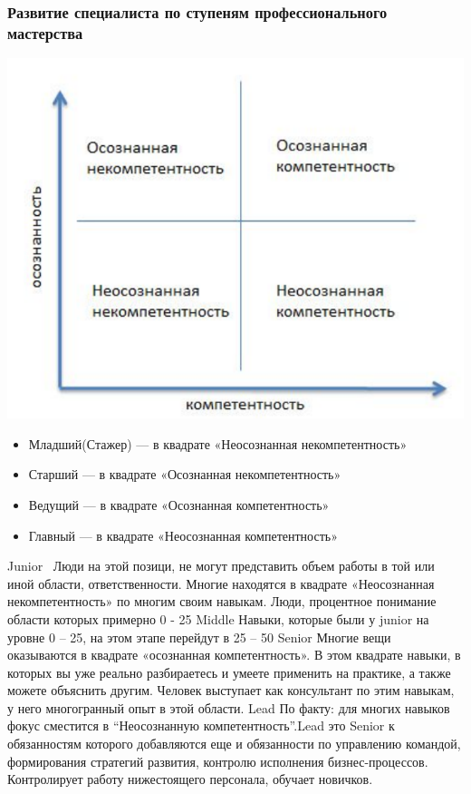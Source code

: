 \documentclass{../industrial-development}
\begin{document}
\begin{frame} \frametitle{Развитие  специалиста по ступеням профессионального мастерства}
 \centerline{\includegraphics[width=0.54\linewidth]{11-IT-specialist's-way/matrix.pdf}}
  \begin{itemize}
  \item Младший(Стажер) --- в квадрате «Неосознанная некомпетентность»
  \item Старший  --- в квадрате «Осознанная некомпетентность»
  \item Ведущий --- в квадрате «Осознанная компетентность»
 \item Главный --- в квадрате «Неосознанная компетентность»
  \end{itemize}
\end{frame}

\lecturenotes
Junior~\cite{JMSL}
Люди на этой позици, не могут представить объем работы в той или иной области, ответственности. Многие находятся в квадрате «Неосознанная некомпетентность» по многим своим навыкам. Люди, процентное понимание области которых примерно 0 - 25%
Middle 
Навыки, которые были у junior на уровне 0 – 25, на этом этапе перейдут в 25 – 50%
Senior
Многие вещи оказываются в квадрате «осознанная компетентность». В этом квадрате навыки, в которых вы уже реально разбираетесь и умеете применить на практике, а также можете объяснить другим. Человек выступает как консультант по этим навыкам, у него многогранный опыт в этой области.
Lead
По факту: для многих навыков фокус сместится в “Неосознанную компетентность”.Lead это Senior к обязанностям которого добавляются еще и обязанности по управлению командой, формирования стратегий развития, контролю исполнения бизнес-процессов. Контролирует работу нижестоящего персонала, обучает новичков.
\end{document}
